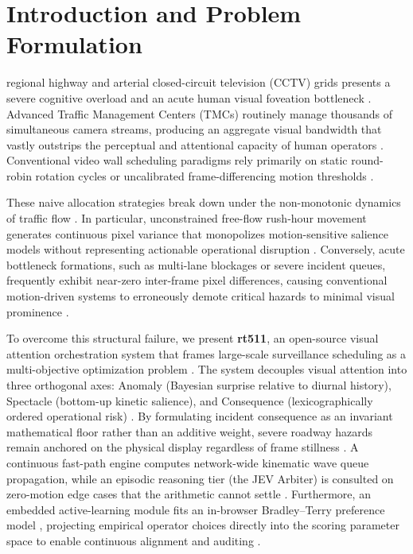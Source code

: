 \documentclass[10pt,journal,compsoc]{IEEEtran}
\begin{document}
\section{Introduction and Problem Formulation}
 regional highway and arterial closed-circuit television (CCTV) grids presents a severe cognitive overload and an acute human visual foveation bottleneck \cite{pirolli1999}. Advanced Traffic Management Centers (TMCs) routinely manage thousands of simultaneous camera streams, producing an aggregate visual bandwidth that vastly outstrips the perceptual and attentional capacity of human operators \cite{itti1998}. Conventional video wall scheduling paradigms rely primarily on static round-robin rotation cycles or uncalibrated frame-differencing motion thresholds \cite{itti1998}. 

These naive allocation strategies break down under the non-monotonic dynamics of traffic flow \cite{greenshields1935}. In particular, unconstrained free-flow rush-hour movement generates continuous pixel variance that monopolizes motion-sensitive salience models without representing actionable operational disruption \cite{itti1998}. Conversely, acute bottleneck formations, such as multi-lane blockages or severe incident queues, frequently exhibit near-zero inter-frame pixel differences, causing conventional motion-driven systems to erroneously demote critical hazards to minimal visual prominence \cite{lighthill1955, richards1956}.

To overcome this structural failure, we present \textbf{rt511}, an open-source visual attention orchestration system that frames large-scale surveillance scheduling as a multi-objective optimization problem \cite{pirolli1999}. The system decouples visual attention into three orthogonal axes: Anomaly (Bayesian surprise relative to diurnal history), Spectacle (bottom-up kinetic salience), and Consequence (lexicographically ordered operational risk) \cite{fishburn1974, itti2009}. By formulating incident consequence as an invariant mathematical floor rather than an additive weight, severe roadway hazards remain anchored on the physical display regardless of frame stillness \cite{fishburn1974}. A continuous fast-path engine computes network-wide kinematic wave queue propagation, while an episodic reasoning tier (the JEV Arbiter) is consulted on zero-motion edge cases that the arithmetic cannot settle \cite{lighthill1955}. Furthermore, an embedded active-learning module fits an in-browser Bradley--Terry preference model \cite{bradley1952}, projecting empirical operator choices directly into the scoring parameter space to enable continuous alignment and auditing \cite{thurstone1927}.
\end{document}
